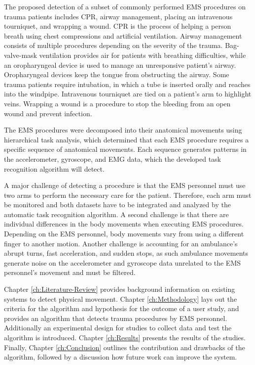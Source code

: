 \par The proposed detection of a subset of commonly performed EMS procedures on trauma patients includes \gls{CPR}, airway management, placing an intravenous tourniquet, and wrapping a wound. CPR is the process of helping a person breath using chest compressions and artificial ventilation. Airway management consists of multiple procedures depending on the severity of the trauma. Bag-valve-mask ventilation provides air for patients with breathing difficulties, while an oropharyngeal device is used to manage an unresponsive patient's airway. Oropharyngeal devices keep the tongue from obstructing the airway. Some trauma patients require intubation, in which a tube is inserted orally and reaches into the windpipe. Intravenous tourniquet are tied on a patient's arm to highlight veins. Wrapping a wound is a procedure to stop the bleeding from an open wound and prevent infection.
\par The EMS procedures were decomposed into their anatomical movements using hierarchical task analysis, which determined that each EMS procedure requires a specific sequence of anatomical movements. Each sequence generates patterns in the accelerometer, gyroscope, and EMG data, which the developed task recognition algorithm will detect.
\par A major challenge of detecting a procedure is that the EMS personnel must use two arms to perform the necessary care for the patient. Therefore, each arm must be monitored and both datasets have to be integrated and analyzed by the automatic task recognition algorithm. A second challenge is that there are individual differences in the body movements when executing EMS procedures. Depending on the EMS personnel, body movements vary from using a different finger to another motion. Another challenge is accounting for an ambulance's abrupt turns, fast acceleration, and sudden stops, as such ambulance movements generate noise on the accelerometer and gyroscope data unrelated to the EMS personnel's movement and must be filtered.
\par Chapter \ref{ch:Literature-Review} provides background information on existing systems to detect physical movement. Chapter \ref{ch:Methodology} lays out the criteria for the algorithm and hypothesis for the outcome of a user study, and provides an algorithm that detects trauma procedures by \gls{EMS} personnel. Additionally an experimental design for studies to collect data and test the algorithm is introduced. Chapter \ref{ch:Results} presents the results of the studies. Finally, Chapter \ref{ch:Conclusion} outlines the contribution and drawbacks of the algorithm, followed by a discussion how future work can improve the system. 